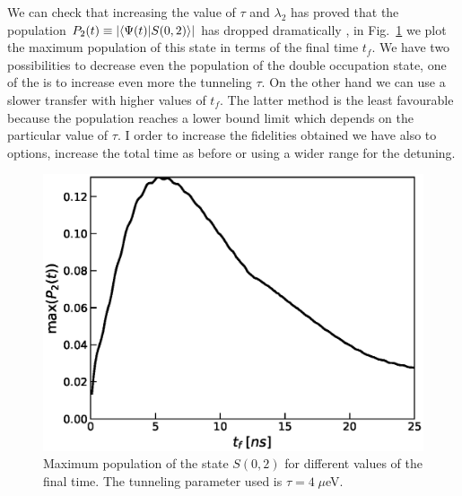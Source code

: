 \documentclass[a4paper,11pt]{article}
\begin{document}
We can check that increasing the value of $\tau$ and $\lambda_2$ has proved that the population $P_2(t)\equiv \abs{\braket{\Psi(t)}{S(0,2)}}$ has dropped  dramatically , in Fig.~\ref{fig:max_pop_S22} we plot the maximum population of this state in terms of the final time $t_f$. We have two possibilities to decrease even the population of the double occupation state, one of the is to increase even more the tunneling $\tau$. On the other hand we can use a slower transfer with higher values of $t_f$. The latter method is the least favourable because the population reaches a lower bound limit which depends on the particular value of $\tau$. I order to increase the fidelities obtained we have also to options, increase the total time as before or using a wider range for the detuning.
\begin{figure}[!htbp]
	\centering
	\includegraphics[width=0.7\linewidth]{max_pop_S22.eps}
	\caption{Maximum population of the state $S(0,2)$ for different values of the final time. The tunneling parameter used is $\tau=4\; \mu$eV.}
	\label{fig:max_pop_S22}
\end{figure}

\newpage
\appendix
\end{document}
